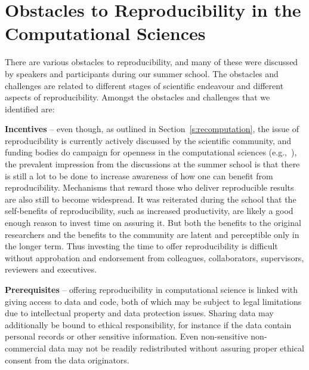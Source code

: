 \section{Obstacles to Reproducibility in the Computational Sciences}
\label{s:obstacles}

There are various obstacles to reproducibility, and many of these were
  discussed by speakers and participants during our summer school.
The obstacles and challenges are related to different stages of scientific 
  endeavour and different aspects of reproducibility.
Amongst the obstacles and challenges that we identified are:

{\bf Incentives} -- even though, as outlined in Section~\ref{s:recomputation}, 
  the issue of reproducibility is
  currently actively discussed by the scientific community, 
  and funding bodies do campaign for
  openness in the computational sciences (e.g.,~\cite{NSF}), 
  the prevalent impression from the discussions at 
  the summer school is that there is still a lot to be done to increase 
  awareness of how one can benefit from reproducibility.
Mechanisms that reward those who deliver reproducible results are also
  still to become widespread.
It was reiterated during the school that the self-benefits 
  of reproducibility, such as increased productivity, are likely 
  a good enough reason to invest time on assuring it.
But both the benefits to the original researchers and the benefits to the community
  are latent and perceptible only in the longer term.
Thus investing the time to offer reproducibility is difficult without
  approbation and endorsement from colleagues, collaborators, supervisors,
  reviewers and executives.
  
{\bf Prerequisites} -- offering reproducibility in computational
  science is linked with giving access to data and code, both of which may
  be subject to legal limitations due to intellectual property and
  data protection issues.
Sharing data may additionally be bound to ethical responsibility, for instance
  if the data contain personal records or other sensitive information.  
Even non-sensitive non-commercial data may not be readily redistributed
  without assuring proper ethical consent from the data originators.

